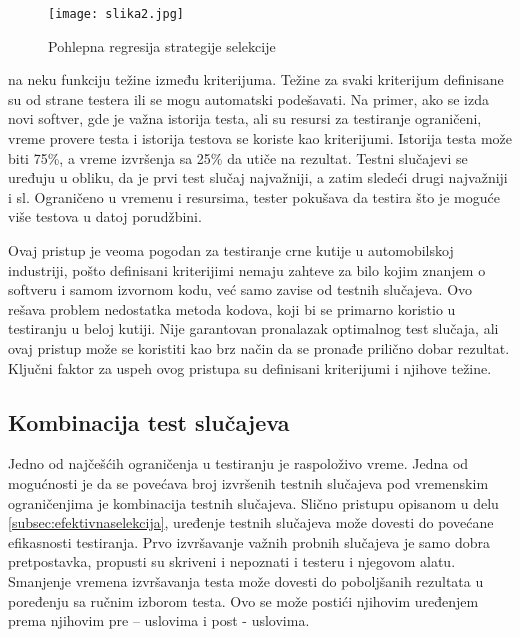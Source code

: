 \documentclass[a4paper]{article}
\begin{document}
\bigbreak
\begin{figure}[h!]
\begin{center}
\texttt{[image: slika2.jpg]}
\end{center}
\caption{Pohlepna regresija strategije selekcije}
\label{fig:slika2}
\end{figure}
\bigbreak

na neku funkciju težine između kriterijuma. Težine za svaki kriterijum definisane su od strane testera ili se mogu automatski podešavati. Na primer, ako se izda novi softver, gde je važna istorija testa, ali su resursi za testiranje ograničeni, vreme provere testa i istorija testova se koriste kao kriterijumi. Istorija testa može biti 75\%, a vreme izvršenja sa 25\% da utiče na rezultat. Testni slučajevi se uređuju u obliku, da je prvi test slučaj najvažniji, a zatim sledeći drugi najvažniji i sl. Ograničeno u vremenu i resursima, tester pokušava da testira što je moguće više testova u datoj porudžbini.
\bigbreak

Ovaj pristup je veoma pogodan za testiranje crne kutije u automobilskoj industriji, pošto definisani kriterijimi nemaju zahteve za bilo kojim znanjem o softveru i samom izvornom kodu, već samo zavise od testnih slučajeva. Ovo rešava problem nedostatka metoda kodova, koji bi se primarno koristio u testiranju u beloj kutiji. Nije garantovan pronalazak optimalnog test slučaja, ali ovaj pristup može se koristiti kao brz način da se pronađe prilično dobar rezultat.
Ključni faktor za uspeh ovog pristupa su definisani kriterijumi i njihove težine.
\bigbreak

\subsection{Kombinacija test slučajeva}
\label{subsec:kombinacijatest}

Jedno od najčešćih ograničenja u testiranju je raspoloživo vreme. Jedna od mogućnosti je da se povećava broj izvršenih testnih slučajeva pod vremenskim ograničenjima je kombinacija testnih slučajeva. Slično pristupu opisanom u delu \ref{subsec:efektivnaselekcija}, uređenje testnih slučajeva može dovesti do povećane efikasnosti testiranja. Prvo izvršavanje važnih probnih slučajeva je samo dobra pretpostavka, propusti su skriveni i nepoznati i testeru i njegovom alatu. Smanjenje vremena izvršavanja testa može dovesti do poboljšanih rezultata u poređenju sa ručnim izborom testa. Ovo se može postići njihovim uređenjem prema njihovim pre – uslovima i post - uslovima.
\end{document}
